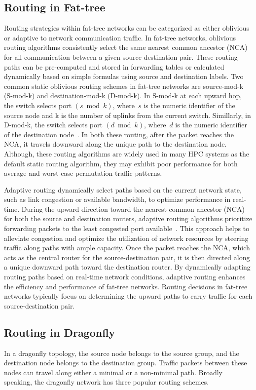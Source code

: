 \subsection{Routing in Fat-tree}
Routing strategies within fat-tree networks can be categorized as either oblivious or adaptive to network communication traffic. In fat-tree networks, oblivious routing algorithms consistently select the same nearest common ancestor (NCA) for all communication between a given source-destination pair. These routing paths can be pre-computed and stored in forwarding tables or calculated dynamically based on simple formulas using source and destination labels. Two common static oblivious routing schemes in fat-tree networks are source-mod-k (S-mod-k) and destination-mod-k (D-mod-k). In S-mod-k at each upward hop, the switch selects port
$(s \bmod k)$, where~$s$ is the numeric identifier of the source node and k is the number of uplinks from the current switch. Simillarly, in D-mod-k, the switch selects port
$(d \bmod k)$, where~$d$ is the numeric identifier of the destination node~\cite{rodriguez2009oblivious, mahapatra2012limited}. In both these routing, after the packet reaches the NCA, it travels downward along the unique path to the destination node. Although, these routing algorithms are widely used in many HPC systems as the default static routing algorithm, they may exhibit poor performance for both average and worst-case permutation traffic patterns. 

Adaptive routing dynamically select paths based on the current network state, such as link congestion or available bandwidth, to optimize performance in real-time. During the upward direction toward the nearest common ancestor (NCA) for both the source and destination routers, adaptive routing algorithms prioritize forwarding packets to the least congested port available~\cite{gomez2007deterministic}. This approach helps to alleviate congestion and optimize the utilization of network resources by steering traffic along paths with ample capacity. Once the packet reaches the NCA, which acts as the central router for the source-destination pair, it is then directed along a unique downward path toward the destination router. By dynamically adapting routing paths based on real-time network conditions, adaptive routing enhances the efficiency and performance of fat-tree networks. Routing decisions in fat-tree networks typically focus on determining the upward paths to carry traffic for each source-destination pair.

\subsection{Routing in Dragonfly}
In a dragonfly topology, the source node belongs to the source group, and the destination node belongs to the destination group. Traffic packets between these nodes can travel along either a minimal or a non-minimal path. Broadly speaking, the dragonfly network has three popular routing schemes.


